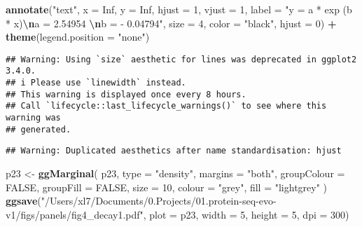 \documentclass[
]{article}
\newenvironment{Shaded}{\begin{snugshade}}{\end{snugshade}}
\newcommand{\AttributeTok}[1]{\textcolor[rgb]{0.13,0.29,0.53}{#1}}
\newcommand{\ConstantTok}[1]{\textcolor[rgb]{0.56,0.35,0.01}{#1}}
\newcommand{\DecValTok}[1]{\textcolor[rgb]{0.00,0.00,0.81}{#1}}
\newcommand{\FunctionTok}[1]{\textcolor[rgb]{0.13,0.29,0.53}{\textbf{#1}}}
\newcommand{\NormalTok}[1]{#1}
\newcommand{\OtherTok}[1]{\textcolor[rgb]{0.56,0.35,0.01}{#1}}
\newcommand{\SpecialCharTok}[1]{\textcolor[rgb]{0.81,0.36,0.00}{\textbf{#1}}}
\newcommand{\StringTok}[1]{\textcolor[rgb]{0.31,0.60,0.02}{#1}}
\begin{document}
\begin{Shaded}
\begin{Highlighting}[]
    \FunctionTok{annotate}\NormalTok{(}\StringTok{"text"}\NormalTok{,  }\AttributeTok{x =} \ConstantTok{Inf}\NormalTok{, }\AttributeTok{y =} \ConstantTok{Inf}\NormalTok{,}
             \AttributeTok{hjust =} \DecValTok{1}\NormalTok{, }\AttributeTok{vjust =} \DecValTok{1}\NormalTok{,}
           \AttributeTok{label =} \StringTok{"y = a * exp (b * x)}\SpecialCharTok{\textbackslash{}n}\StringTok{a = 2.54954 }\SpecialCharTok{\textbackslash{}n}\StringTok{b = {-} 0.04794"}\NormalTok{,}
           \AttributeTok{size =} \DecValTok{4}\NormalTok{, }\AttributeTok{color =} \StringTok{"black"}\NormalTok{, }\AttributeTok{hjust =} \DecValTok{0}\NormalTok{) }\SpecialCharTok{+} \FunctionTok{theme}\NormalTok{(}\AttributeTok{legend.position =} \StringTok{"none"}\NormalTok{)}
\end{Highlighting}
\end{Shaded}

\begin{verbatim}
## Warning: Using `size` aesthetic for lines was deprecated in ggplot2 3.4.0.
## i Please use `linewidth` instead.
## This warning is displayed once every 8 hours.
## Call `lifecycle::last_lifecycle_warnings()` to see where this warning was
## generated.
\end{verbatim}

\begin{verbatim}
## Warning: Duplicated aesthetics after name standardisation: hjust
\end{verbatim}

\begin{Shaded}
\begin{Highlighting}[]
\NormalTok{p23 }\OtherTok{\textless{}{-}} \FunctionTok{ggMarginal}\NormalTok{(}
\NormalTok{  p23,}
  \AttributeTok{type =} \StringTok{"density"}\NormalTok{,}
  \AttributeTok{margins =} \StringTok{"both"}\NormalTok{,}
  \AttributeTok{groupColour =} \ConstantTok{FALSE}\NormalTok{,}
  \AttributeTok{groupFill =} \ConstantTok{FALSE}\NormalTok{,}
  \AttributeTok{size =} \DecValTok{10}\NormalTok{,}
  \AttributeTok{colour =} \StringTok{"grey"}\NormalTok{,}
  \AttributeTok{fill =} \StringTok{"lightgrey"}
\NormalTok{)}
\FunctionTok{ggsave}\NormalTok{(}\StringTok{"/Users/xl7/Documents/0.Projects/01.protein{-}seq{-}evo{-}v1/figs/panels/fig4\_decay1.pdf"}\NormalTok{, }
       \AttributeTok{plot =}\NormalTok{ p23, }\AttributeTok{width =} \DecValTok{5}\NormalTok{, }\AttributeTok{height =} \DecValTok{5}\NormalTok{, }\AttributeTok{dpi =} \DecValTok{300}\NormalTok{)}
\end{Highlighting}
\end{Shaded}
\end{document}
